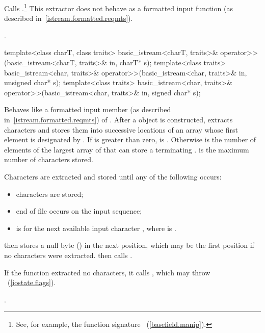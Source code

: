 \begin{itemdescr}
\pnum
\effects
Calls
.\footnote{See, for example, the function signature
~(\ref{basefield.manip}).}
This extractor does not behave as a formatted input function
(as described in~\ref{istream.formatted.reqmts}).

\pnum
\returns
{}.
\end{itemdescr}

%
\begin{itemdecl}
template<class charT, class traits>
  basic_istream<charT, traits>& operator>>(basic_istream<charT, traits>& in,
                                           charT* s);
template<class traits>
  basic_istream<char, traits>& operator>>(basic_istream<char, traits>& in,
                                          unsigned char* s);
template<class traits>
  basic_istream<char, traits>& operator>>(basic_istream<char, traits>& in,
                                          signed char* s);
\end{itemdecl}

\begin{itemdescr}
\pnum
\effects
Behaves like a formatted input member (as described in~\ref{istream.formatted.reqmts})
of .
After a
object is constructed,
extracts characters and stores them into
successive locations of an array whose first element is designated by
.
If
is greater than zero,  is
.
Otherwise  is the number of elements
of the largest array of
that can store a terminating
.
 is the maximum number of characters stored.

\pnum
Characters are extracted and stored until any of the following occurs:
\begin{itemize}
\item
{}
characters are stored;
\item
end of file occurs on the input sequence;
\item
{}
is
for the next available input character ,
where  is
.
\end{itemize}

\pnum
{}
then stores a null byte
()
in the next position, which may be the first position if no characters
were extracted.
then calls
.

\pnum
If the function extracted no characters, it calls
,
which may throw
~(\ref{iostate.flags}).

\pnum
\returns
{}.
\end{itemdescr}

